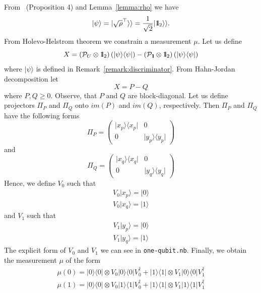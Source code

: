 \documentclass[preprint,12pt, a4paper]{elsarticle}
\newcommand{\ket}[1]{\ensuremath{|#1\rangle}}
\newcommand{\bra}[1]{\ensuremath{\langle#1|}}
\newcommand{\ketbra}[2]{\ensuremath{\ket{#1}\bra{#2}}}
\newcommand{\proj}[1]{\ensuremath{\ketbra{#1}{#1}}}
\newcommand{\1}{{\rm 1\hspace{-0.9mm}l}}
\newcommand{\Id}{{\rm 1\hspace{-0.9mm}l}}
\newcommand{\PP}{\mathcal{P}}
\begin{document}
From ~\cite{puchala2018strategies}(Proposition 4) and Lemma~\ref{lemma:rho} we 
have 
\begin{equation}
\ket{\psi} = | \sqrt{\rho}^\top \rangle \rangle = \frac{1}{\sqrt{2}} |\Id_2 
\rangle \rangle. 
\end{equation}
From Holevo-Helstrom theorem  we constrain a measurement $\mu$.  
Let us define \begin{equation}
X  = \left( \PP_U \otimes \Id_2 \right)(\proj{\psi}) -  \left( \PP_\Id 
\otimes \Id_2 \right)(\proj{\psi})
\end{equation}
where $\ket{\psi}$ is defined in Remark~\ref{remark:discriminator}. From 
Hahn-Jordan decomposition let \begin{equation}
X = P - Q
\end{equation}
where $P, Q \ge 0 $. Observe, that $P $ and $Q$ are block-diagonal. 
Let us define projectors $\Pi_P$ and $\Pi_Q$ onto  $im(P)$ and $im(Q)$, 
respectively. Then  $\Pi_P$ and $\Pi_Q$ have the following forms
\begin{equation}
\Pi_P = \left(\begin{array}{cc}\proj{x_p}&0\\0&\proj{y_p}\end{array}\right) 
\end{equation}
and 
\begin{equation}
\Pi_Q = \left(\begin{array}{cc}\proj{x_q}&0\\0&\proj{y_q}\end{array}\right) 
\end{equation}
Hence, we define $V_0$ such that
\begin{equation}
\begin{split}
V_0 \ket{x_p} = \ket{0} \\ 
V_0 \ket{x_q} = \ket{1}
\end{split}
\end{equation}
and $V_1$ such that
\begin{equation}
\begin{split}
V_1 \ket{y_p} = \ket{0} \\ 
V_1 \ket{y_q} = \ket{1}
\end{split}
\end{equation}
The explicit form of $V_0$ and $V_1$ we can see in \texttt{one-qubit.nb}.
Finally, we obtain the measurement $\mu$ of the form
\begin{equation}
\begin{split}
\mu(0) = \proj{0} \otimes V_0 \proj{0} V_0^\dagger +  \proj{1} \otimes V_1 
\proj{0} V_1^\dagger  \\ 
\mu(1) = \proj{0} \otimes V_0 \proj{1} V_0^\dagger +  \proj{1} \otimes V_1 
\proj{1} V_1^\dagger  
\end{split}
\end{equation}
\end{document}
